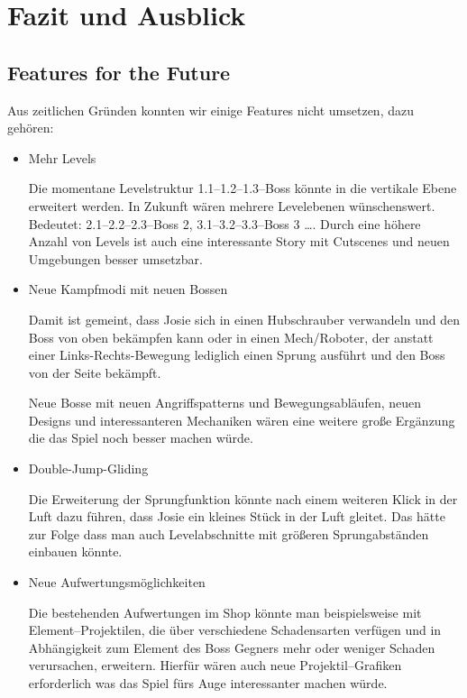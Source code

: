 \chapter{Fazit und Ausblick}\label{ch:fazit}

\section{Features for the Future}\label{sec:6_Features}

Aus zeitlichen Gründen konnten wir einige Features nicht umsetzen, dazu gehören:

\begin{itemize}

\item Mehr Levels

Die momentane Levelstruktur 1.1--1.2--1.3--Boss könnte in die vertikale Ebene erweitert werden. In Zukunft wären mehrere Levelebenen wünschenswert. Bedeutet: 2.1--2.2--2.3--Boss 2,  3.1--3.2--3.3--Boss 3 \dots. Durch eine höhere Anzahl von Levels ist auch eine interessante Story mit Cutscenes und neuen Umgebungen besser umsetzbar. 

\item Neue Kampfmodi mit neuen Bossen

Damit ist gemeint, dass Josie sich in einen Hubschrauber verwandeln und den Boss von oben bekämpfen kann oder in einen Mech/Roboter, der anstatt einer Links-Rechts-Bewegung lediglich einen Sprung ausführt und den Boss von der Seite bekämpft.

Neue Bosse mit neuen Angriffspatterns und Bewegungsabläufen, neuen Designs und interessanteren Mechaniken wären eine weitere große Ergänzung die das Spiel noch besser machen würde.

\item Double-Jump-Gliding

Die Erweiterung der Sprungfunktion könnte nach einem weiteren Klick in der Luft dazu führen, dass Josie ein kleines Stück in der Luft gleitet. Das hätte zur Folge dass man auch Levelabschnitte mit größeren Sprungabständen einbauen könnte.

\item Neue Aufwertungsmöglichkeiten

Die bestehenden Aufwertungen im Shop könnte man beispielsweise mit Element--Projektilen, die über verschiedene Schadensarten verfügen und in Abhängigkeit zum Element des Boss Gegners mehr oder weniger Schaden verursachen, erweitern. Hierfür wären auch neue Projektil--Grafiken erforderlich was das Spiel fürs Auge interessanter machen würde.

\end{itemize}
